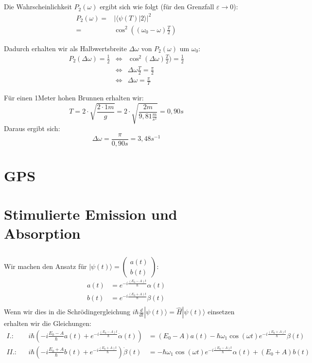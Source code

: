 \documentclass[11pt, ngerman, fleqn, DIV=15, headinclude]{scrartcl}
\begin{document}
\subsection{}
	Die Wahrscheinlichkeit $P_2(\omega)$ ergibt sich wie folgt (für den Grenzfall $\varepsilon\rightarrow0$):
	\begin{align*}
		P_2(\omega)=& |\langle\psi(T)|2\rangle|^2 \\
				=&\cos^2((\omega_0-\omega)\frac{T}{2})
	\end{align*}	

	Dadurch erhalten wir als Halbwertsbreite $\Delta\omega$ von $P_2(\omega)$ um $\omega_0$:
	\begin{eqnarray*}
		P_2(\Delta\omega)=\frac{1}{2} & \Longleftrightarrow & \cos^2(\Delta\omega)\frac{T}{2})=\frac{1}{2} \\
		&\Longleftrightarrow & \Delta\omega\frac{T}{2}=\frac{\pi}{2} \\
		&\Longleftrightarrow & \Delta\omega=\frac{\pi}{T}
	\end{eqnarray*}
	
	Für einen 1Meter hohen Brunnen erhalten wir:
	\[ T=2\cdot \sqrt{\frac{2\cdot 1m}{g}} =2\cdot\sqrt{\frac{2m}{9,81\frac{m}{s^2}}}=0,90s \]
	Daraus ergibt sich:
	\[ \Delta\omega=\frac{\pi}{0,90s}=3,48s^{-1} \]


\section{GPS}


\section{Stimulierte Emission und Absorption}

\subsection{}
	Wir machen den Ansatz für $|\psi(t)\rangle=\begin{pmatrix}a(t)\\b(t)\end{pmatrix}$:
	\begin{align*}
		a(t)&=e^{-i\frac{(E_0-A)t}{\hbar}}\alpha(t) \\
		b(t)&=e^{-i\frac{(E_0+A)t}{\hbar}}\beta(t) \\
	\end{align*}
 	Wenn wir dies in die Schrödingergleichung $i\hbar\frac{d}{dt}|\psi(t)\rangle=\hat{H}|\psi(t)\rangle$ einsetzen erhalten wir die Gleichungen:
	\begin{align*}
	I.: &&	i\hbar(-i\frac{E_0-A}{\hbar}a(t)+e^{-i\frac{(E_0-A)t}{\hbar}}\dot{\alpha}(t))&=(E_0-A)a(t)-\hbar\omega_1 \cos(\omega t) e^{-i\frac{(E_0+A)t}{\hbar}}\beta(t) \\
	II.:&&	i\hbar(-i\frac{E_0+A}{\hbar}b(t)+e^{-i\frac{(E_0+A)t}{\hbar}})\dot{\beta}(t)&=-\hbar\omega_1\cos(\omega t) e^{-i\frac{(E_0-A)t}{\hbar}}\alpha(t)+(E_0+A)b(t)
	\end{align*}
\end{document}
